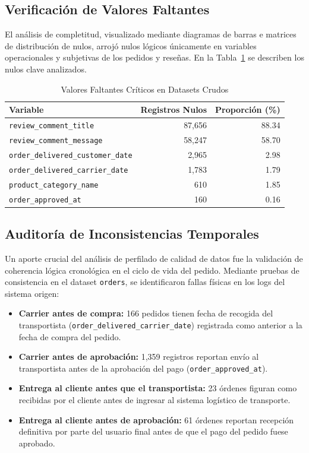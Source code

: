 \documentclass[journal,letterpaper]{IEEEtran}
\begin{document}
\subsection{Verificación de Valores Faltantes}
El análisis de completitud, visualizado mediante diagramas de barras e matrices de distribución de nulos, arrojó nulos lógicos únicamente en variables operacionales y subjetivas de los pedidos y reseñas. En la Tabla~\ref{tab:nulls} se describen los nulos clave analizados.

\begin{table}[h]
\centering
\caption{Valores Faltantes Críticos en Datasets Crudos}
\label{tab:nulls}
\begin{tabular}{lrr}
\toprule
Variable & Registros Nulos & Proporción (\%) \\
\midrule
\texttt{review\_comment\_title} & 87,656 & 88.34 \\
\texttt{review\_comment\_message} & 58,247 & 58.70 \\
\texttt{order\_delivered\_customer\_date} & 2,965 & 2.98 \\
\texttt{order\_delivered\_carrier\_date} & 1,783 & 1.79 \\
\texttt{product\_category\_name} & 610 & 1.85 \\
\texttt{order\_approved\_at} & 160 & 0.16 \\
\bottomrule
\end{tabular}
\end{table}

\subsection{Auditoría de Inconsistencias Temporales}
Un aporte crucial del análisis de perfilado de calidad de datos fue la validación de coherencia lógica cronológica en el ciclo de vida del pedido. Mediante pruebas de consistencia en el dataset \texttt{orders}, se identificaron fallas físicas en los logs del sistema origen:
\begin{itemize}
    \item \textbf{Carrier antes de compra:} 166 pedidos tienen fecha de recogida del transportista (\texttt{order\_delivered\_carrier\_date}) registrada como anterior a la fecha de compra del pedido.
    \item \textbf{Carrier antes de aprobación:} 1,359 registros reportan envío al transportista antes de la aprobación del pago (\texttt{order\_approved\_at}).
    \item \textbf{Entrega al cliente antes que el transportista:} 23 órdenes figuran como recibidas por el cliente antes de ingresar al sistema logístico de transporte.
    \item \textbf{Entrega al cliente antes de aprobación:} 61 órdenes reportan recepción definitiva por parte del usuario final antes de que el pago del pedido fuese aprobado.
\end{itemize}
\end{document}
